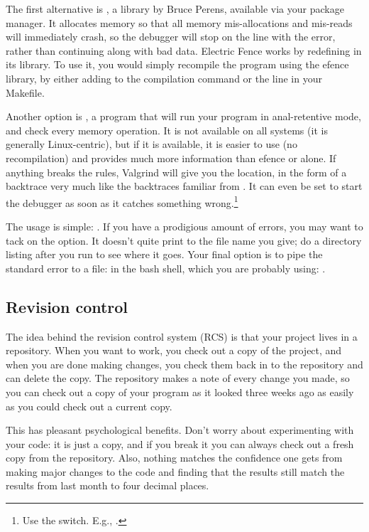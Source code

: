 The first alternative is , a library by Bruce Perens,
available via your package manager. It allocates memory so that all memory
mis-allocations and mis-reads will immediately crash, so
the debugger will stop on the line with the error, rather than continuing
along with bad data. Electric Fence works by redefining 
in its library. To use it, you would simply recompile the program using
the efence library, by either adding  to the compilation command
or the  line in your Makefile.


Another option is , a program that will
run your program in anal-retentive mode, and check every memory operation. 
It is not available on all systems (it is generally Linux-centric), but
if it is available, it is easier to use (no recompilation) and provides much more information than efence or
 alone. If anything breaks the rules, Valgrind will give you
the location, in the form of a backtrace very much like the backtraces
familiar from . It can even be set to start the debugger as soon
as it catches something wrong.\footnote{Use the  switch.
E.g., .}

The usage is simple: . If you have a prodigious amount
of errors, you may want to tack on the  option. It doesn't
quite print to the file name you give; do a directory listing after you run  to see where it goes.  Your final option is to pipe the standard
error to a file: in the bash shell, which you are probably using: .

\subsection{Revision control}  \label{valgrind}
The idea behind the revision control system (RCS) is that your project
lives in a repository. When you want to work, you check out
a copy of the project, and when you are done making changes, you check
them back in to the repository and can delete the copy.  The repository
makes a note of every change you made, so you can check out a copy of
your program as it looked three weeks ago as easily as you could check
out a current copy.

This has pleasant psychological benefits. Don't worry about experimenting
with your code: it is just a copy, and if you break it you can always check
out a fresh copy from the repository. Also, nothing matches the confidence
one gets from making major changes to the code and finding that the
results still match the results from last month to four decimal places.

